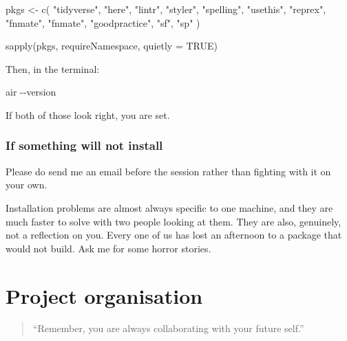 \documentclass[
  letterpaper,
  justified,
  a4paper]{tufte-book}
\makeatletter
\newenvironment{Shaded}{\begin{snugshade}}{\end{snugshade}}
\newcommand{\AttributeTok}[1]{\textcolor[rgb]{0.40,0.45,0.13}{#1}}
\newcommand{\ConstantTok}[1]{\textcolor[rgb]{0.56,0.35,0.01}{#1}}
\newcommand{\ExtensionTok}[1]{\textcolor[rgb]{0.00,0.23,0.31}{#1}}
\newcommand{\FunctionTok}[1]{\textcolor[rgb]{0.28,0.35,0.67}{#1}}
\newcommand{\NormalTok}[1]{\textcolor[rgb]{0.00,0.23,0.31}{#1}}
\newcommand{\OtherTok}[1]{\textcolor[rgb]{0.00,0.23,0.31}{#1}}
\newcommand{\StringTok}[1]{\textcolor[rgb]{0.13,0.47,0.30}{#1}}
\let\rbporigShaded\Shaded
\let\rbporigendShaded\endShaded
\renewenvironment{Shaded}{%
  \begingroup
  \ifdim\linewidth=\rbpbodywidth
    \advance\linewidth by \@tufte@overhang
    \advance\hsize by \@tufte@overhang
    \advance\columnwidth by \@tufte@overhang
  \fi
  \rbporigShaded
}{%
  \rbporigendShaded
  \endgroup
}
\makeatother
\begin{document}
\begin{Shaded}
\begin{Highlighting}[]
\NormalTok{pkgs }\OtherTok{\textless{}{-}} \FunctionTok{c}\NormalTok{(}
  \StringTok{"tidyverse"}\NormalTok{, }\StringTok{"here"}\NormalTok{, }\StringTok{"lintr"}\NormalTok{, }\StringTok{"styler"}\NormalTok{,}
  \StringTok{"spelling"}\NormalTok{, }\StringTok{"usethis"}\NormalTok{, }\StringTok{"reprex"}\NormalTok{, }\StringTok{"fnmate"}\NormalTok{,}
  \StringTok{"fnmate"}\NormalTok{, }\StringTok{"goodpractice"}\NormalTok{, }\StringTok{"sf"}\NormalTok{, }\StringTok{"sp"}
\NormalTok{)}

\FunctionTok{sapply}\NormalTok{(pkgs, requireNamespace, }\AttributeTok{quietly =} \ConstantTok{TRUE}\NormalTok{)}
\end{Highlighting}
\end{Shaded}

Then, in the terminal:

\begin{Shaded}
\begin{Highlighting}[]
\ExtensionTok{air} \AttributeTok{{-}{-}version}
\end{Highlighting}
\end{Shaded}

If both of those look right, you are set.

\subsection*{If something will not
install}\label{if-something-will-not-install}

Please do send me an email before the session rather than fighting with
it on your own.

Installation problems are almost always specific to one machine, and
they are much faster to solve with two people looking at them. They are
also, genuinely, not a reflection on you. Every one of us has lost an
afternoon to a package that would not build. Ask me for some horror
stories.


\chapter{Project organisation}\label{project-organisation-1}

\begin{quote}
``Remember, you are always collaborating with your future self.''
\end{quote}
\end{document}

